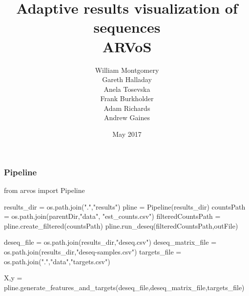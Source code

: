\documentclass[table,dvipsnames]{beamer}
\title[ARVoS]{Adaptive results visualization of sequences \\ ARVoS}
\author[]{William Montgomery\\ Gareth Halladay \\ Anela Tosevska \\ Frank Burkholder \\ Adam Richards \\ Andrew Gaines}
\date[]{May 2017}
\begin{document}
\frame{\titlepage}



\begin{frame}[fragile]
\frametitle{Pipeline}
\begin{code}

from arvos import Pipeline

results_dir = os.path.join(".","results")
pline = Pipeline(results_dir)
countsPath = os.path.join(parentDir,"data", "est_counts.csv")
filteredCountsPath = pline.create_filtered(countsPath)
pline.run_deseq(filteredCountsPath,outFile)

deseq_file = os.path.join(results_dir,"deseq.csv")
deseq_matrix_file = os.path.join(results_dir,"deseq-samples.csv")
targets_file = os.path.join(".","data","targets.csv")

X,y = pline.generate_features_and_targets(deseq_file,deseq_matrix_file,targets_file)

\end{code}
\end{frame}
\end{document}
